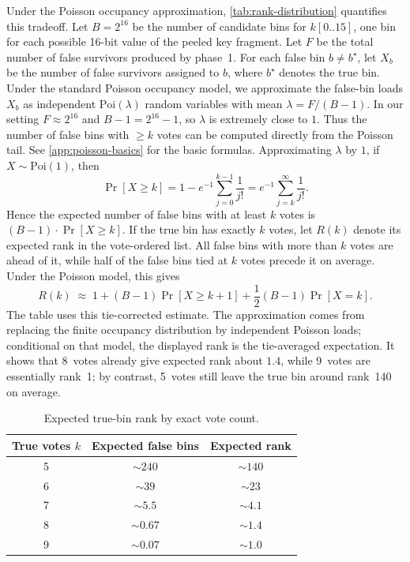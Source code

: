 \documentclass[version=preprint]{iacrcc}
\begin{document}
Under the Poisson occupancy approximation, \autoref{tab:rank-distribution} quantifies this tradeoff.
Let $B = 2^{16}$ be the number of candidate bins for $k[0..15]$, one bin for each possible 16-bit value of the peeled key fragment.
Let $F$ be the total number of false survivors produced by phase~1.
For each false bin $b \neq b^{\star}$, let $X_b$ be the number of false survivors assigned to $b$, where $b^{\star}$ denotes the true bin.
Under the standard Poisson occupancy model, we approximate the false-bin loads $X_b$ as independent $\mathrm{Poi}(\lambda)$ random variables with mean $\lambda = F/(B-1)$.
In our setting $F \approx 2^{16}$ and $B-1 = 2^{16}-1$, so $\lambda$ is extremely close to $1$.
Thus the number of false bins with $\geq k$ votes can be computed directly from the Poisson tail.
See \autoref{app:poisson-basics} for the basic formulas.
Approximating $\lambda$ by $1$, if $X \sim \mathrm{Poi}(1)$, then
\[
\Pr[X \geq k] = 1 - e^{-1}\sum_{j=0}^{k-1} \frac{1}{j!}
= e^{-1}\sum_{j=k}^{\infty} \frac{1}{j!}.
\]
Hence the expected number of false bins with at least $k$ votes is $(B-1) \cdot \Pr[X \geq k]$.
If the true bin has exactly $k$ votes, let $R(k)$ denote its expected rank in the vote-ordered list.
All false bins with more than $k$ votes are ahead of it, while half of the false bins tied at $k$ votes precede it on average.
Under the Poisson model, this gives
\[
R(k) \;\approx\; 1 + (B-1)\Pr[X \geq k+1] + \frac{1}{2}(B-1)\Pr[X = k].
\]
The table uses this tie-corrected estimate.
The approximation comes from replacing the finite occupancy distribution by independent Poisson loads; conditional on that model, the displayed rank is the tie-averaged expectation.
It shows that 8~votes already give expected rank about $1.4$, while 9~votes are essentially rank~1; by contrast, 5~votes still leave the true bin around rank~140 on average.

\begin{table}[htbp]
  \centering
  \caption{Expected true-bin rank by exact vote count.}
  \label{tab:rank-distribution}
  \setlength{\tabcolsep}{10pt}
  \begin{tabular}{ccc}
    \toprule
    True votes $k$ & Expected false bins & Expected rank \\
    \midrule
    5 & $\sim 240$ & $\sim 140$ \\
    6 & $\sim 39$ & $\sim 23$ \\
    7 & $\sim 5.5$ & $\sim 4.1$ \\
    8 & $\sim 0.67$ & $\sim 1.4$ \\
    9 & $\sim 0.07$ & $\sim 1.0$ \\
    \bottomrule
  \end{tabular}
\end{table}
\end{document}
